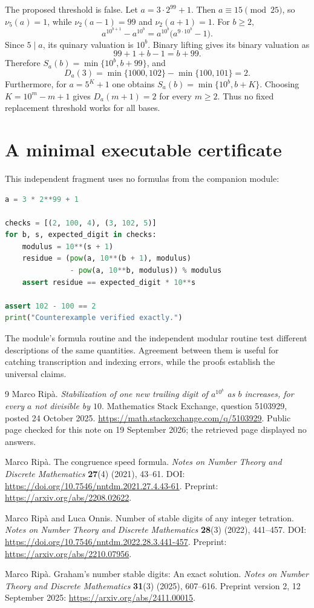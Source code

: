 \documentclass[11pt,a4paper]{article}
\theoremstyle{definition}
\begin{document}
\begin{resultbox}
The proposed threshold is false. Let $a=3\cdot2^{99}+1$.
Then $a\equiv15\pmod{25}$, so $\nu_5(a)=1$, while
$\nu_2(a-1)=99$ and $\nu_2(a+1)=1$.
For $b\ge2$,
\[
a^{10^{b+1}}-a^{10^b}=a^{10^b}\bigl(a^{9\cdot10^b}-1\bigr).
\]
Since $5\mid a$, its quinary valuation is $10^b$.
Binary lifting gives its binary valuation as
\[
99+1+b-1=b+99.
\]
Therefore $S_a(b)=\min\{10^b,b+99\}$, and
\[
D_a(3)=\min\{1000,102\}-\min\{100,101\}=2.
\]
Furthermore, for $a=5^K+1$ one obtains
$S_a(b)=\min\{10^b,b+K\}$. Choosing
$K=10^m-m+1$ gives $D_a(m+1)=2$ for every $m\ge2$.
Thus no fixed replacement threshold works for all bases.
\end{resultbox}

\section{A minimal executable certificate}\label{app:certificate}
This independent fragment uses no formulas from the companion module:
\begin{lstlisting}[language=Python]
a = 3 * 2**99 + 1

checks = [(2, 100, 4), (3, 102, 5)]
for b, s, expected_digit in checks:
    modulus = 10**(s + 1)
    residue = (pow(a, 10**(b + 1), modulus)
               - pow(a, 10**b, modulus)) % modulus
    assert residue == expected_digit * 10**s

assert 102 - 100 == 2
print("Counterexample verified exactly.")
\end{lstlisting}
The module's formula routine and the independent modular routine test
different descriptions of the same quantities. Agreement between them is
useful for catching transcription and indexing errors, while the proofs
establish the universal claims.

\clearpage
{}
{}
\begin{thebibliography}{9}
Marco Rip\`a.
\emph{Stabilization of one new trailing digit of $a^{10^b}$ as $b$ increases,
for every $a$ not divisible by $10$}.
Mathematics Stack Exchange, question 5103929, posted 24 October 2025.
\url{https://math.stackexchange.com/q/5103929}.
Public page checked for this note on 19 September 2026; the retrieved page
displayed no answers.

Marco Rip\`a.
The congruence speed formula.
\emph{Notes on Number Theory and Discrete Mathematics}
\textbf{27}(4) (2021), 43--61.
DOI: \url{https://doi.org/10.7546/nntdm.2021.27.4.43-61}.
Preprint: \url{https://arxiv.org/abs/2208.02622}.

Marco Rip\`a and Luca Onnis.
Number of stable digits of any integer tetration.
\emph{Notes on Number Theory and Discrete Mathematics}
\textbf{28}(3) (2022), 441--457.
DOI: \url{https://doi.org/10.7546/nntdm.2022.28.3.441-457}.
Preprint: \url{https://arxiv.org/abs/2210.07956}.

Marco Rip\`a.
Graham's number stable digits: An exact solution.
\emph{Notes on Number Theory and Discrete Mathematics}
\textbf{31}(3) (2025), 607--616.
Preprint version 2, 12 September 2025:
\url{https://arxiv.org/abs/2411.00015}.
\end{thebibliography}
\end{document}

